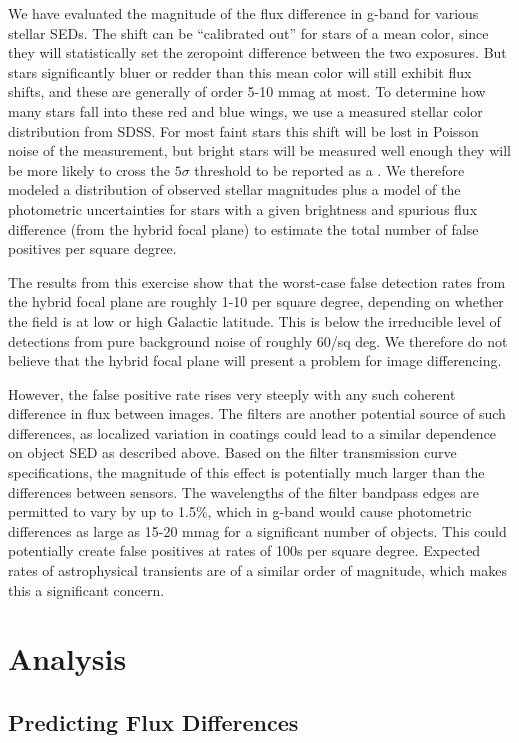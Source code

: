 \documentclass[DM]{lsstdoc}
\begin{document}
We have evaluated the magnitude of the flux difference in g-band for various
stellar SEDs. The shift can be ``calibrated out'' for stars of a mean color,
since they will statistically set the zeropoint difference between the two
exposures. But stars significantly bluer or redder than this mean color will
still exhibit flux shifts, and these are generally of order 5-10 mmag at most.
To determine how many stars fall into these red and blue wings, we use a
measured stellar color distribution from SDSS. For most faint stars
this shift will be lost in Poisson noise of the measurement, but bright stars
will be measured well enough they will be more likely to cross the $5\sigma$
threshold to be reported as a \DIASources. We therefore modeled a distribution
of observed stellar magnitudes plus a model of the photometric uncertainties for
stars with a given brightness and spurious flux difference (from the hybrid focal
plane) to estimate the total number of false positives per square degree.

The results from this exercise show that the worst-case false detection rates
from the hybrid focal plane are roughly 1-10 per square degree, depending on
whether the field is at low or high Galactic latitude. This is below the
irreducible level of detections from pure background noise of roughly 60/sq deg.
We therefore do not believe that the hybrid focal plane will present a problem
for image differencing.

However, the false positive rate rises very steeply with any such coherent
difference in flux between images. The filters are another potential source of
such differences, as localized variation in coatings could lead to a similar
dependence on object SED as described above. Based on the filter transmission
curve specifications, the magnitude of this effect is potentially much larger
than the differences between sensors. The wavelengths of the filter bandpass
edges are permitted to vary by up to 1.5\%, which in g-band would cause
photometric differences as large as 15-20 mmag for a significant number of
objects. This could potentially create false positives at rates of 100s per
square degree. Expected rates of astrophysical transients are of a similar order
of magnitude, which makes this a significant concern.

\section{Analysis}

\subsection{Predicting Flux Differences}
\end{document}
